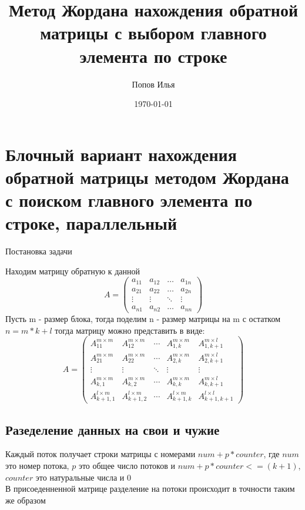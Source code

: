 \documentclass[a4paper,12pt]{article}
\begin{document}
\author{Попов Илья}


\title{Метод Жордана нахождения обратной матрицы с выбором главного элемента по строке}
\date{\today}
\maketitle

\section{Блочный вариант нахождения обратной матрицы методом Жордана с поиском 
главного элемента по строке, параллельный}
\begin{center}
{Постановка задачи}
\end{center}

Находим матрицу обратную к данной
$$A=
   \begin{pmatrix}
     a_{11}& a_{12} &\ldots & a_{1n}\\
     a_{21}& a_{22} &\ldots & a_{2n}\\
     \vdots& \vdots &\ddots & \vdots\\
     a_{n1}& a_{n2} &\ldots & a_{nn}
    \end{pmatrix}
$$
Пусть m - размер блока, тогда поделим n - размер матрицы на m с остатком $n = m*k + l$ тогда матрицу
можно представить в виде:
$$A=
  \begin{pmatrix} 
    A_{11}^{m \times m} & A_{12}^{m \times m} & \cdots & A_{1,k}^{m \times m} & A_{1,k+1}^{m \times l} \\
    A_{21}^{m \times m} & A_{22}^{m \times m} & \cdots & A_{2,k}^{m \times m} & A_{2,k+1}^{m \times l} \\ 
    \vdots & \vdots & \ddots & \vdots & \vdots \\ 
    A_{k,1}^{m \times m} & A_{k,2}^{m \times m} & \cdots & A_{k,k}^{m \times m} & A_{k,k+1}^{m \times l} \\
    A_{k+1,1}^{l \times m} & A_{k+1,2}^{l \times m} & \cdots & A_{k+1,k}^{l \times m} & A_{k+1,k+1}^{l \times l} 
  \end{pmatrix}
$$

\subsection{Разеделение данных на свои и чужие}
Каждый поток получает строки матрицы с номерами $num + p * counter$, где $num$ это номер потока, 
$p$ это общее число потоков и $num + p * counter <= (k + 1)$, $counter$ это натуральные числа и 0\\
В присоеденненной матрице разделение на потоки происходит в точности таким же образом
\end{document}
